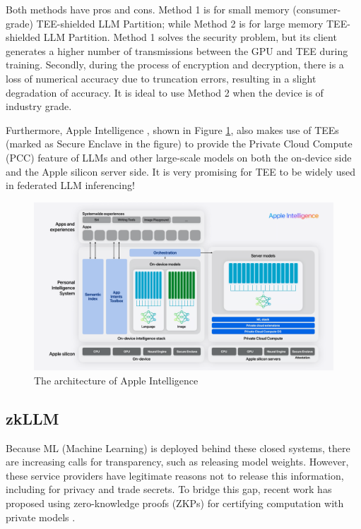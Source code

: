 \documentclass[lang=en]{sjtuarticle}
\begin{document}
Both methods have pros and cons. Method 1 is for small memory (consumer-grade) TEE-shielded
LLM Partition; while Method 2 is for large memory TEE-shielded LLM Partition. Method 1 solves the security problem, but its client generates
a higher number of transmissions between the GPU and TEE
during training. Secondly, during the process of encryption
and decryption, there is a loss of numerical accuracy due to
truncation errors, resulting in a slight degradation of accuracy. It is ideal to use Method 2 when the device is of industry grade.

Furthermore, Apple Intelligence \cite{apple}, shown in Figure \ref{fig:apple}, also makes use of TEEs (marked as Secure Enclave in the figure) to provide the Private Cloud Compute (PCC) feature of LLMs and other large-scale models on both the on-device side and the Apple silicon server side. It is very promising for TEE to be widely used in federated LLM inferencing!

\begin{figure}[h]
    \centering
    \includegraphics[width=\textwidth]{AppleIntelligence.png}
    \caption{The architecture of Apple Intelligence \cite{apple}}
    \label{fig:apple}
\end{figure}

\subsection{zkLLM}\label{sec:zkllm}

Because ML (Machine Learning) is deployed
behind these closed systems, there are increasing calls for
transparency, such as releasing model weights. However,
these service providers have legitimate reasons not to release
this information, including for privacy and trade secrets.
To bridge this gap, recent work has proposed using zero-knowledge
proofs (ZKPs)
for certifying computation with private models \cite{chen2024zkml}.
\end{document}
